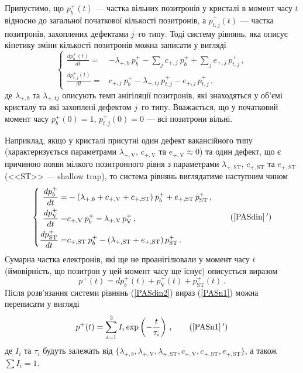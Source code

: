 Припустимо, що
$p_{b}^+(t)$ --- частка вільних позитронів у кристалі в момент часу $t$ відносно до загальної початкової кількості позитронів, а
$p_{t,j}^+(t)$  --- частка позитронів, захоплених дефектами $j$--го типу.
Тоді систему рівнянь, яка описує кінетику зміни кількості позитронів можна записати у вигляді
\begin{equation}\label{PASdin}
\left\{
\begin{aligned}%
\frac{dp_{b}^+(t)}{dt}=& -\lambda_{+,b} \:p_{b}^+ - \sum_j c_{+,j} \:p_{b}^+ + \sum_j e_{+,j} \,p_{t,j}^+ \,,\\
\frac{dp_{t,j}^+(t)}{dt}=& c_{+,j} \:p_{b}^+ - \lambda_{+,tj}\,p_{t,j}^+ - e_{+,j} \,p_{t,j}^+ \,,
\end{aligned} \right.
\end{equation}
де
$\lambda_{+,b}$ та $\lambda_{+,tj}$ описують темп анігіляції позитронів, які знаходяться
у об'ємі кристалу та які захоплені дефектом $j$--го  типу.
Вважається, що у початковий момент часу $p_{b}^+(0)=1$, $p_{t,j}^+(0)=0$ --- всі позитрони вільні.

Наприклад, якщо у кристалі присутні один дефект вакансійного типу
(характеризується параметрами $\lambda_{+,\mathrm{V}}$, $c_{+,\mathrm{V}}$ та $e_{+,\mathrm{V}}\approx0$)
та один дефект, що є причиною появи мілкого позитронного рівня з параметрами
$\lambda_{+,\mathrm{ST}}$, $c_{+,\mathrm{ST}}$ та $e_{+,\mathrm{ST}}$ (<<ST>> --- shallow trap),
то система рівнянь виглядатиме наступним чином
\begin{equation}\label{PASdin2}
\left\{
\begin{aligned}%
\frac{dp_{b}^+}{dt}=& -(\lambda_{+,b}+c_{+,\mathrm{V}}+c_{+,\mathrm{ST}}) \:p_{b}^+ +e_{+,\mathrm{ST}}\,p_{\mathrm{ST}}^+ \,,\\
\frac{dp_{\mathrm{V}}^+}{dt}=& c_{+,\mathrm{V}} \:p_{b}^+ - \lambda_{+,\mathrm{V}}\,p_{\mathrm{V}}^+ \,,\\
\frac{dp_{\mathrm{ST}}^+}{dt}=& c_{+,\mathrm{ST}} \:p_{b}^+ - (\lambda_{+,\mathrm{ST}}+e_{+,\mathrm{ST}})\,p_{\mathrm{ST}}^+ \,.
\end{aligned} \right.\tag{\ref{PASdin}\,$'$}
\end{equation}
Сумарна частка електронів, які ще не проанігілювали у момент часу $t$
(ймовірність, що позитрон у цей момент часу ще існує) описується виразом
\begin{equation}\label{PASn1}
p^+(t)=dp_{b}^+(t) + p_{\mathrm{V}}^+(t) + p_{\mathrm{ST}}^+(t)\,.
\end{equation}
Після розв'язання системи рівнянь (\ref{PASdin2}) вираз (\ref{PASn1})  можна
переписати у вигляді
\begin{equation}\label{PASn2}
p^+(t)=\sum_{i=1}^3I_i\exp\left(-\frac{t}{\tau_i}\right)\,,\tag{\ref{PASn1}\,$'$}
\end{equation}
де
$I_i$ та $\tau_i$ будуть залежать від $\{\lambda_{+,b},\lambda_{+,\mathrm{V}},\lambda_{+,\mathrm{ST}},c_{+,\mathrm{V}},c_{+,\mathrm{ST}},e_{+,\mathrm{ST}}\}$,
а також $\sum I_i=1$.

